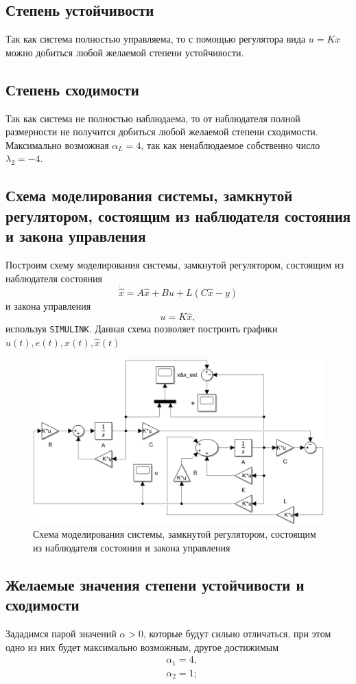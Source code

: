 \documentclass[a4paper, 12pt]{article}
\begin{document}
    
    \subsection{Степень устойчивости}
    Так как система полностью управляема, то с помощью регулятора вида $u=Kx$ можно добиться
    любой желаемой степени устойчивости.


    \subsection{Степень сходимости}
    Так как система не полностью наблюдаема, то от наблюдателя полной размерности не получится
    добиться любой желаемой степени сходимости. Максимально возможная $\alpha_L=4$, так как
    ненаблюдаемое собственно число $\lambda_2=-4$.


    \subsection{Схема моделирования системы, замкнутой регулятором, состоящим из наблюдателя состояния и закона управления}
    Построим схему моделирования системы, замкнутой регулятором, состоящим из наблюдателя состояния
    $$\dot{\hat{x}}=A\hat{x}+Bu+L\left( C\hat{x}-y \right)$$ и закона управления $$u=K\hat{x},$$ используя \texttt{SIMULINK}.
    Данная схема позволяет построить графики $u(t),e(t),x(t),\hat{x}(t)$
    \begin{figure}[H]
        \centering
        \includegraphics[scale=0.5]{scheme_task2.png}
        \captionsetup{skip=0pt}
        \caption{Схема моделирования системы, замкнутой регулятором, состоящим из наблюдателя состояния и закона управления}
        \label{fig:scheme_task2}
    \end{figure}


    \subsection{Желаемые значения степени устойчивости и сходимости}
    Зададимся парой значений $\alpha>0$, которые будут сильно отличаться, при этом
    одно из них будет максимально возможным, другое достижимым
    \begin{align*}
        &\alpha_1=4,\\
        &\alpha_2=1;
    \end{align*}
\end{document}
